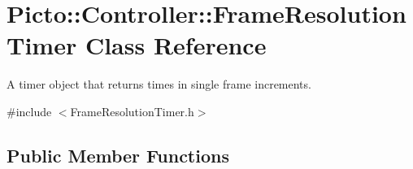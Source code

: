 \hypertarget{class_picto_1_1_controller_1_1_frame_resolution_timer}{\section{Picto\-:\-:Controller\-:\-:Frame\-Resolution\-Timer Class Reference}
\label{class_picto_1_1_controller_1_1_frame_resolution_timer}
}


A timer object that returns times in single frame increments.  




{\ttfamily \#include $<$Frame\-Resolution\-Timer.\-h$>$}

\subsection*{Public Member Functions}

